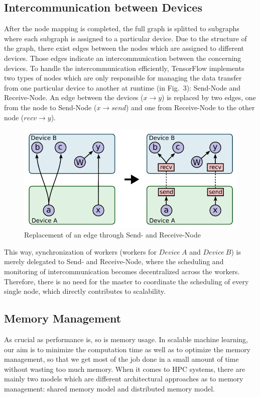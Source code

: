 \documentclass[ieeetran]{article}
\begin{document}
\subsection{Intercommunication between Devices} %
\label{sub:intercommunication_between_devices}
After the node mapping is completed, the full graph is splitted to subgraphs where each subgraph is assigned to a particular device. Due to the structure of the graph, there exist edges between the nodes which are assigned to different devices. Those edges indicate an intercommunication between the concerning devices. To handle the intercommunication efficiently, TensorFlow implements two types of nodes which are only responsible for managing the data transfer from one particular device to another at runtime (in Fig.\ 3): Send-Node and Receive-Node. An edge between the devices ($x \rightarrow y$) is replaced by two edges, one from the node to Send-Node ($x \rightarrow send$) and one from Receive-Node to the other node ($recv \rightarrow y$).
\pagebreak
\begin{figure}[h!]
  \centering
  \includegraphics[width=0.5\linewidth]{intercommunication}
  \caption{Replacement of an edge through Send- and Receive-Node}
  \label{fig:intercommunication}
\end{figure}

\hspace{-0.52cm}This way, synchronization of workers (workers for $Device \ A$ and $Device\ B$) is merely delegated to Send- and Receive-Node, where the scheduling and monitoring of intercommunication becomes decentralized across the workers. Therefore, there is no need for the master to coordinate the scheduling of every single node, which directly contributes to scalability.

\subsection{Memory Management} %
\label{sub:memory_management}
As crucial as performance is, so is memory usage. In scalable machine learning, our aim is to minimize the computation time as well as to optimize the memory management, so that we get most of the job done in a small amount of time without wasting too much memory. When it comes to HPC systems, there are mainly two models which are different architectural approaches as to memory management: shared memory model and distributed memory model.
\end{document}
